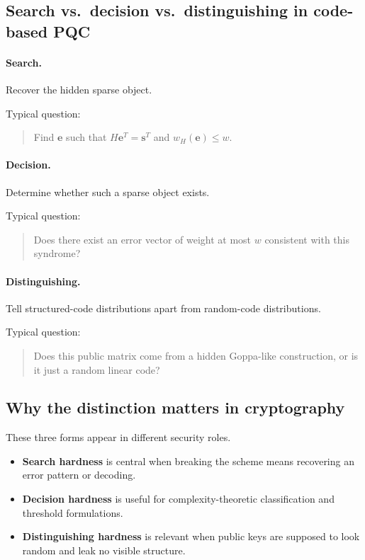 \documentclass[11pt]{article}
\begin{document}
	\subsection{Search vs.\ decision vs.\ distinguishing in code-based PQC}
	
	\paragraph{Search.}
	Recover the hidden sparse object.
	
	Typical question:
	\begin{quote}
		Find $\bm e$ such that $H\bm e^T = \bm s^T$ and $w_H(\bm e)\le w$.
	\end{quote}
	
	\paragraph{Decision.}
	Determine whether such a sparse object exists.
	
	Typical question:
	\begin{quote}
		Does there exist an error vector of weight at most $w$ consistent with this syndrome?
	\end{quote}
	
	\paragraph{Distinguishing.}
	Tell structured-code distributions apart from random-code distributions.
	
	Typical question:
	\begin{quote}
		Does this public matrix come from a hidden Goppa-like construction, or is it just a random linear code?
	\end{quote}
	
	\subsection{Why the distinction matters in cryptography}
	
	These three forms appear in different security roles.
	
	\begin{itemize}
		\item \textbf{Search hardness} is central when breaking the scheme means recovering an error pattern or decoding.
		\item \textbf{Decision hardness} is useful for complexity-theoretic classification and threshold formulations.
		\item \textbf{Distinguishing hardness} is relevant when public keys are supposed to look random and leak no visible structure.
	\end{itemize}
	
\end{document}
